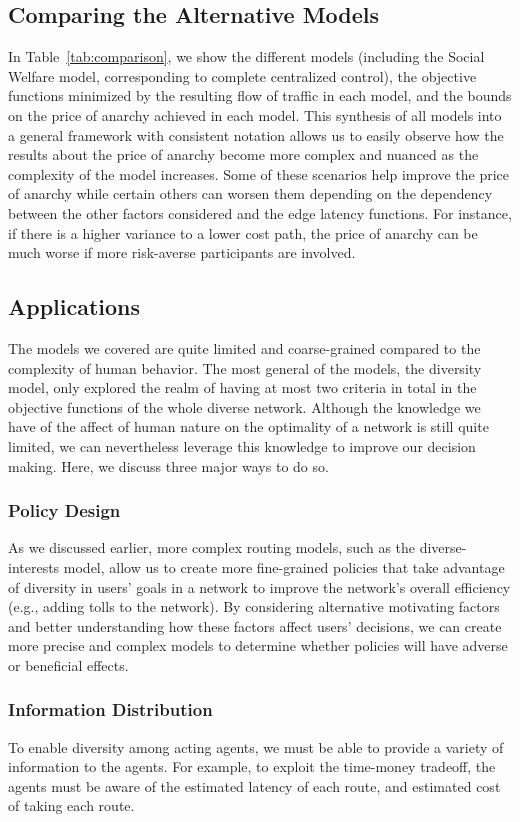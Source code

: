\subsection{Comparing the Alternative Models}
In Table~\ref{tab:comparison}, we show the different models (including the Social Welfare model, corresponding to complete centralized control), the objective functions minimized 
by the resulting flow of traffic in each model, and the bounds on the price of anarchy achieved in each model. This synthesis of all models into a general framework with consistent notation allows us to easily observe how the results about the price of anarchy become more complex and nuanced as the complexity of the model increases. Some of these scenarios help improve the price of anarchy while certain others can worsen them depending on the dependency between the other factors considered and the edge latency functions. For
instance, if there is a higher variance to a lower cost path, the price of anarchy can be much worse if more risk-averse participants are involved.

\subsection{Applications}
The models we covered are quite limited and coarse-grained compared to the complexity of human behavior. The most general of the models, the diversity model, only explored the realm of having at most two criteria in total in the objective functions of the whole diverse network.
Although the knowledge we have of the affect of human nature on the optimality of a network is still quite limited, we can nevertheless leverage this knowledge to improve our decision making. Here, we discuss three major ways to do so.

\subsubsection{Policy Design}
As we discussed earlier, more complex routing models, such as the diverse-interests model, allow us to create more fine-grained policies that take advantage of diversity in users' goals in a network to improve the network's overall efficiency (e.g., adding tolls to the network).
By considering alternative motivating factors and better understanding how these factors affect users' decisions, we can create more precise and complex models to determine whether policies will have adverse or beneficial effects.

\subsubsection{Information Distribution}
To enable diversity among acting agents, we must be able to provide a variety of information to the agents. For example, to exploit the time-money tradeoff, the agents must be aware of the estimated latency of each route, and estimated cost of taking each route. 

